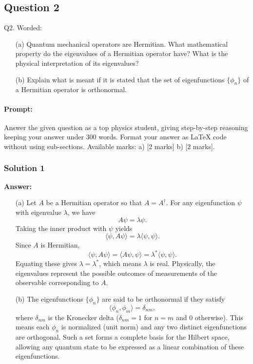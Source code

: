 \documentclass{article}
\begin{document}
\subsection{Question 2}
\noindent Q2. Worded:

\begin{enumerate}
    \item[(a)] Quantum mechanical operators are Hermitian. What mathematical property do the eigenvalues of a Hermitian operator have? What is the physical interpretation of its eigenvalues?
    \item[(b)] Explain what is meant if it is stated that the set of eigenfunctions $\{\phi_n\}$ of a Hermitian operator is orthonormal.
\end{enumerate}


\paragraph{Prompt: \\} 
Answer the given question as a top physics student, giving step-by-step reasoning keeping your answer under 300 words. Format your answer as LaTeX code without using sub-sections. Available marks: a) [2 marks] b) [2 marks].

\subsubsection{Solution 1}
\textbf{Answer:} 

\begin{enumerate}
    \item[(a)] Let $A$ be a Hermitian operator so that $A = A^\dagger$. For any eigenfunction $\psi$ with eigenvalue $\lambda$, we have 
    \[
    A\psi = \lambda \psi.
    \]
    Taking the inner product with $\psi$ yields 
    \[
    \langle \psi, A\psi \rangle = \lambda \langle \psi, \psi \rangle.
    \]
    Since $A$ is Hermitian, 
    \[
    \langle \psi, A\psi \rangle = \langle A\psi, \psi \rangle = \lambda^* \langle \psi, \psi \rangle.
    \]
    Equating these gives $\lambda = \lambda^*$, which means $\lambda$ is real. Physically, the eigenvalues represent the possible outcomes of measurements of the observable corresponding to $A$.
    
    \item[(b)] The eigenfunctions $\{\phi_n\}$ are said to be orthonormal if they satisfy 
    \[
    \langle \phi_n, \phi_m \rangle = \delta_{nm},
    \]
    where $\delta_{nm}$ is the Kronecker delta ($\delta_{nm}=1$ for $n=m$ and $0$ otherwise). This means each $\phi_n$ is normalized (unit norm) and any two distinct eigenfunctions are orthogonal. Such a set forms a complete basis for the Hilbert space, allowing any quantum state to be expressed as a linear combination of these eigenfunctions.
\end{enumerate}
\end{document}
